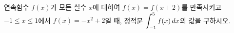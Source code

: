 연속함수 $f(x)$가 모든 실수 $x$에 대하여 $f(x)=f(x+2)$를 만족시키고 $-1\le x\le 1$에서 $f(x)=-x^2+2$일 때, 정적분 $\displaystyle\int_{-1}^{5}f(x)\mkern3mu dx$의 값을 구하시오.
